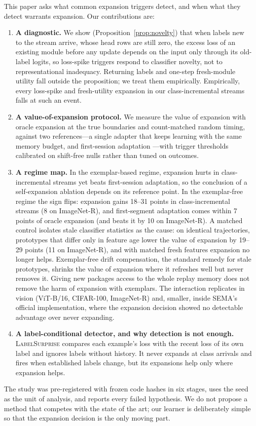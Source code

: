 \documentclass[10pt]{article}
\newcommand{\ls}{\textsc{LabelSurprise}}
\begin{document}
This paper asks what common expansion triggers detect, and when what they detect warrants expansion. Our contributions are:
\begin{enumerate}
\item \textbf{A diagnostic.} We show (Proposition~\ref{prop:novelty}) that when labels new to the stream arrive, whose head rows are still zero, the excess loss of an existing module before any update depends on the input only through its old-label logits, so loss-spike triggers respond to classifier novelty, not to representational inadequacy. Returning labels and one-step fresh-module utility fall outside the proposition; we treat them empirically. Empirically, every loss-spike and fresh-utility expansion in our class-incremental streams falls at such an event.
\item \textbf{A value-of-expansion protocol.} We measure the value of expansion with oracle expansion at the true boundaries and count-matched random timing, against two references---a single adapter that keeps learning with the same memory budget, and first-session adaptation \citep{panos2023fsa,zhou2024aper}---with trigger thresholds calibrated on shift-free nulls rather than tuned on outcomes.
\item \textbf{A regime map.} In the exemplar-based regime, expansion hurts in class-incremental streams yet beats first-session adaptation, so the conclusion of a self-expansion ablation depends on its reference point. In the exemplar-free regime the sign flips: expansion gains 18--31 points in class-incremental streams (8 on ImageNet-R), and first-segment adaptation comes within 7 points of oracle expansion (and beats it by 10 on ImageNet-R). A matched control isolates stale classifier statistics as the cause: on identical trajectories, prototypes that differ only in feature age lower the value of expansion by 19--29 points (11 on ImageNet-R), and with matched fresh features expansion no longer helps. Exemplar-free drift compensation, the standard remedy for stale prototypes, shrinks the value of expansion where it refreshes well but never removes it. Giving new packages access to the whole replay memory does not remove the harm of expansion with exemplars. The interaction replicates in vision (ViT-B/16, CIFAR-100, ImageNet-R) and, smaller, inside SEMA's official implementation, where the expansion decision showed no detectable advantage over never expanding.
\item \textbf{A label-conditional detector, and why detection is not enough.} \ls{} compares each example's loss with the recent loss of its own label and ignores labels without history. It never expands at class arrivals and fires when established labels change, but its expansions help only where expansion helps.
\end{enumerate}
The study was pre-registered with frozen code hashes in six stages, uses the seed as the unit of analysis, and reports every failed hypothesis. We do not propose a method that competes with the state of the art; our learner is deliberately simple so that the expansion decision is the only moving part.
\end{document}
